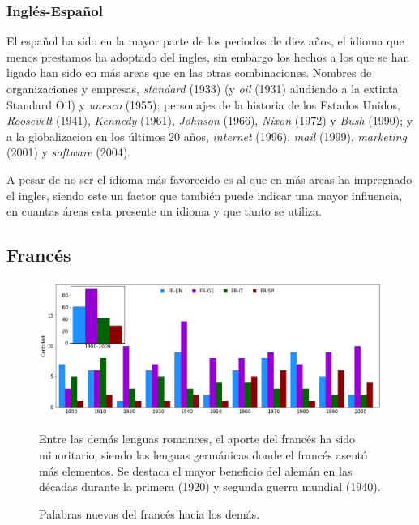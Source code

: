 \subsubsection*{Inglés-Español} %
El español ha sido en la mayor parte de los periodos de diez años,  el idioma
que menos prestamos ha adoptado del ingles, sin embargo los hechos a los que se
han ligado han sido en más areas que en las otras combinaciones.  Nombres de
organizaciones y empresas,  \textit{standard} (1933) (y \textit{oil} (1931)
aludiendo a la extinta Standard Oil) y \textit{unesco} (1955);  personajes de
la historia de los Estados Unidos,  \textit{Roosevelt} (1941), \textit{Kennedy}
(1961), \textit{Johnson} (1966),  \textit{Nixon} (1972) y \textit{Bush} (1990);
y a la globalizacion en los últimos 20 años, \textit{internet} (1996),
\textit{mail} (1999), \textit{marketing} (2001) y \textit{software} (2004).   

A pesar de no ser el idioma más favorecido es al que en más areas ha impregnado
el ingles, siendo este un factor que también puede indicar una mayor
influencia,  en cuantas áreas esta presente un idioma y que tanto se utiliza. 


\clearpage

\subsection{Francés} %

\begin{figure}[h!]
	\centering
	\includegraphics[scale=.38]{Cap_3/NC_FR.png}
	\label{fig.NC_FR}
	\caption{Palabras nuevas del francés hacia los demás.}
	\smallskip
	\small
	Entre las demás lenguas romances, el aporte del francés ha sido minoritario, siendo las lenguas germánicas donde el francés asentó más elementos. Se destaca el mayor beneficio del alemán en las décadas durante la primera (1920) y segunda guerra mundial (1940).
	
	
\end{figure}

